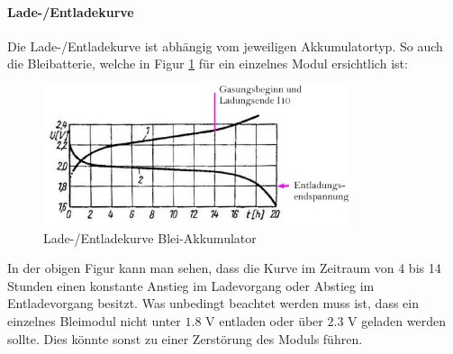 \newpage

\paragraph{Lade-/Entladekurve}
Die Lade-/Entladekurve ist abhängig vom jeweiligen Akkumulatortyp. So auch die Bleibatterie, welche in Figur \ref{fig:pb_akku_kurve} für ein einzelnes Modul ersichtlich ist:

\begin{figure}[h!]
	\centering
		\includegraphics[width=0.8\textwidth]{images/pb_akku_kurve.jpg}
	\caption{Lade-/Entladekurve Blei-Akkumulator \cite{pb_akku_kurve}}
	\label{fig:pb_akku_kurve}
\end{figure}

In der obigen Figur kann man sehen, dass die Kurve im Zeitraum von 4 bis 14 Stunden einen konstante Anstieg im Ladevorgang oder Abstieg im Entladevorgang besitzt. Was unbedingt beachtet werden muss ist, dass ein einzelnes Bleimodul nicht unter $1.8$ V entladen oder über $2.3$ V geladen werden sollte. Dies könnte sonst zu einer Zerstörung des Moduls führen.

\newpage